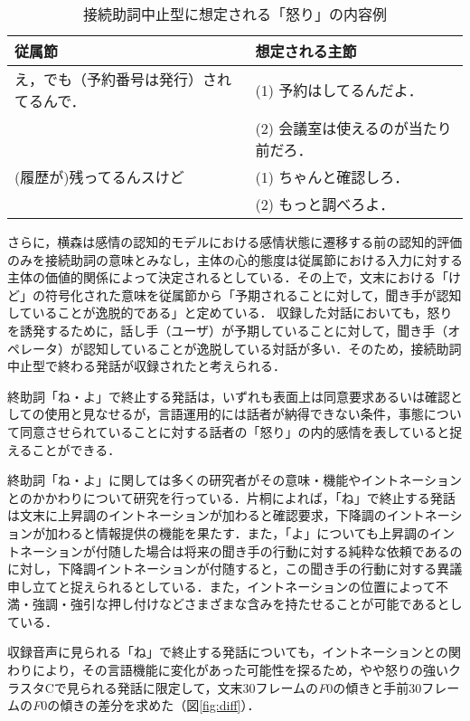 \documentclass[japanese]{jnlp_1.3c}
\begin{document}
\begin{table}[b] 
\caption{接続助詞中止型に想定される「怒り」の内容例}
\label{tb:sample}
\begin{center}
\begin{tabular}{ll}
\hline
従属節&想定される主節 \\ \hline
え，でも（予約番号は発行）されてるんで．&(1) 予約はしてるんだよ．\\
 &(2) 会議室は使えるのが当たり前だろ．\\ \hline
(履歴が)残ってるんスけど&(1) ちゃんと確認しろ．\\
 &(2) もっと調べろよ．\\ \hline
\end{tabular}
\end{center}
\end{table}

さらに，横森は感情の認知的モデルにおける感情状態に遷移する前の認知的評価のみを接続助詞の意味とみなし，主体の心的態度は従属節における入力に対する主体の価値的関係によって決定されるとしている\cite{Yokomori2006}．その上で，文末における「けど」の符号化された意味を従属節から「予期されることに対して，聞き手が認知していることが逸脱的である」と定めている．
収録した対話においても，怒りを誘発するために，話し手（ユーザ）が予期していることに対して，聞き手（オペレータ）が認知していることが逸脱している対話が多い．そのため，接続助詞中止型で終わる発話が収録されたと考えられる．

終助詞「ね・よ」で終止する発話は，いずれも表面上は同意要求あるいは確認としての使用と見なせるが，言語運用的には話者が納得できない条件，事態について同意させられていることに対する話者の「怒り」の内的感情を表していると捉えることができる．

終助詞「ね・よ」に関しては多くの研究者\cite[など]{Katagiri1997,Sugito2001,Inukai2001,Moriyama2001}がその意味・機能やイントネーションとのかかわりについて研究を行っている．片桐\cite{Katagiri1997}によれば，「ね」で終止する発話は文末に上昇調のイントネーションが加わると確認要求，下降調のイントネーションが加わると情報提供の機能を果たす．また，「よ」についても上昇調のイントネーションが付随した場合は将来の聞き手の行動に対する純粋な依頼であるのに対し，下降調イントネーションが付随すると，この聞き手の行動に対する異議申し立てと捉えられるとしている．また，イントネーションの位置によって不満・強調・強引な押し付けなどさまざまな含みを持たせることが可能であるとしている．

収録音声に見られる「ね」で終止する発話についても，イントネーションとの関わりにより，その言語機能に変化があった可能性を探るため，やや怒りの強いクラスタCで見られる発話に限定して，文末30フレームの{\it F}{\tiny 0}の傾きと手前30フレームの{\it F}{\tiny 0}の傾きの差分を求めた（図\ref{fig:diff}）．
\end{document}
